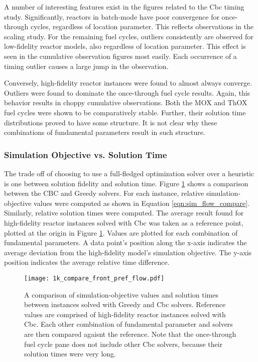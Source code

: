 A number of interesting features exist in the figures related to the Cbc timing
study. Significantly, reactors in batch-mode have poor convergence for
once-through cycles, regardless of location parameter. This reflects
observations in the scaling study. For the remaining fuel cycles, outliers
consistently are observed for low-fidelity reactor models, also regardless of
location parameter. This effect is seen in the cumulative observation figures
most easily. Each occurrence of a timing outlier causes a large jump in the
observation. 

Conversely, high-fidelity reactor instances were found to almost always
converge. Outliers were found to dominate the once-through fuel cycle
results. Again, this behavior results in choppy cumulative observations. Both
the MOX and ThOX fuel cycles were shown to be comparatively stable. Further,
their solution time distributions proved to have some structure. It is not clear
why these combinations of fundamental parameters result in such structure.

\subsubsection{Simulation Objective vs. Solution Time}

The trade off of choosing to use a full-fledged optimization solver over a
heuristic is one between solution fidelity and solution time. Figure
\ref{fig:1k_compare_front_pref_flow} shows a comparison between the CBC and
Greedy solvers. For each instance, relative simulation-objective values were
computed as shown in Equation \ref{eqn:sim_flow_compare}. Similarly, relative
solution times were computed. The average result found for high-fidelity reactor
instances solved with Cbc was taken as a reference point, plotted at the origin
in Figure \ref{fig:1k_compare_front_pref_flow}. Values are plotted for each
combination of fundamental parameters. A data point's position along the x-axis
indicates the average deviation from the high-fidelity model's simulation
objective. The y-axis position indicates the average relative time difference.

\begin{figure}[h!]
  \begin{center}
    \texttt{[image: 1k\_compare\_front\_pref\_flow.pdf]}
    \caption[]{
      \label{fig:1k_compare_front_pref_flow}
      A comparison of simulation-objective values and solution times between
      instances solved with Greedy and Cbc solvers. Reference values are
      comprised of high-fidelity reactor instances solved with Cbc. Each other
      combination of fundamental parameter and solvers are then compared agaisnt
      the reference. Note that the once-through fuel cycle pane does not include
      other Cbc solvers, because their solution times were very long.
    }
  \end{center}
\end{figure}

